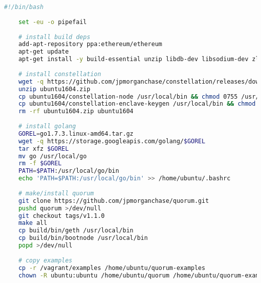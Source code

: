 \begin{center}\begin{lstlisting}[language=sh,caption={Script di bootstrap utilizzato dal Vagrantfile},captionpos=b,frame=lines,basicstyle=\linespread{0.9}\small]
	#!/bin/bash
							      
	set -eu -o pipefail
							      
	# install build deps
	add-apt-repository ppa:ethereum/ethereum
	apt-get update
	apt-get install -y build-essential unzip libdb-dev libsodium-dev zlib1g-dev libtinfo-dev solc sysvbanner wrk
							      
	# install constellation
	wget -q https://github.com/jpmorganchase/constellation/releases/download/v0.0.1-alpha/ubuntu1604.zip
	unzip ubuntu1604.zip
	cp ubuntu1604/constellation-node /usr/local/bin && chmod 0755 /usr/local/bin/constellation-node
	cp ubuntu1604/constellation-enclave-keygen /usr/local/bin && chmod 0755 /usr/local/bin/constellation-enclave-keygen
	rm -rf ubuntu1604.zip ubuntu1604
							      
	# install golang
	GOREL=go1.7.3.linux-amd64.tar.gz
	wget -q https://storage.googleapis.com/golang/$GOREL
	tar xfz $GOREL
	mv go /usr/local/go
	rm -f $GOREL
	PATH=$PATH:/usr/local/go/bin
	echo 'PATH=$PATH:/usr/local/go/bin' >> /home/ubuntu/.bashrc
							      
	# make/install quorum
	git clone https://github.com/jpmorganchase/quorum.git
	pushd quorum >/dev/null
	git checkout tags/v1.1.0
	make all
	cp build/bin/geth /usr/local/bin
	cp build/bin/bootnode /usr/local/bin
	popd >/dev/null
							      
	# copy examples
	cp -r /vagrant/examples /home/ubuntu/quorum-examples
	chown -R ubuntu:ubuntu /home/ubuntu/quorum /home/ubuntu/quorum-examples
	\end{lstlisting}
\end{center}
%
